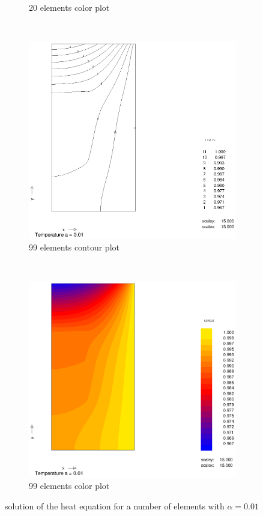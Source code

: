 \documentclass[10pt,a4paper]{article}
\begin{document}
\begin{figure}[h]
\begin{subfigure}[b]{0.45\textwidth}
                \caption{20 elements color plot}
                \label{fig:colplot_a001_50el}
        \end{subfigure}
        ~
        \begin{subfigure}[b]{0.45\textwidth}
                \includegraphics[width=\textwidth]{cont_a001_99el}
                \caption{99 elements contour plot}
                \label{fig:cont_a001_99el}
        \end{subfigure}
        ~ 
        \begin{subfigure}[b]{0.45\textwidth}
                \includegraphics[width=\textwidth]{colplot_a001_99el}
                \caption{99 elements color plot}
                \label{fig:colplot_a001_99el}
        \end{subfigure}
        \caption{solution of the heat equation for a number of elements with $\alpha = 0.01$} 
        \label{fig:10}                                
\end{figure}
\newpage
\appendix
\end{document}
